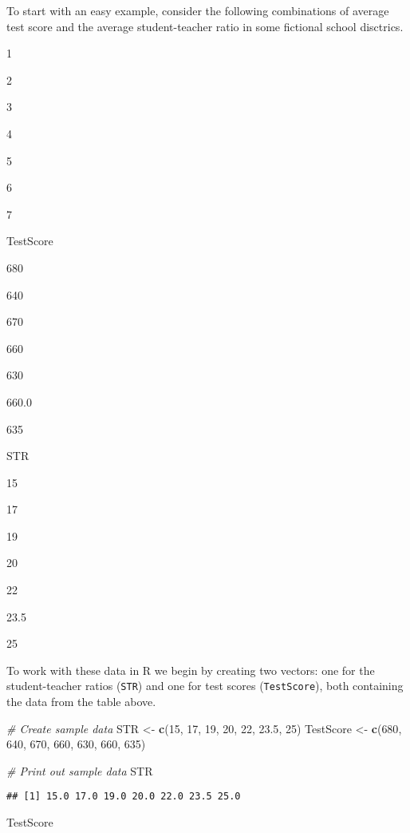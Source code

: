 \documentclass[]{book}
\newenvironment{Shaded}{\begin{snugshade}}{\end{snugshade}}
\newcommand{\KeywordTok}[1]{\textcolor[rgb]{0.13,0.29,0.53}{\textbf{#1}}}
\newcommand{\DecValTok}[1]{\textcolor[rgb]{0.00,0.00,0.81}{#1}}
\newcommand{\FloatTok}[1]{\textcolor[rgb]{0.00,0.00,0.81}{#1}}
\newcommand{\StringTok}[1]{\textcolor[rgb]{0.31,0.60,0.02}{#1}}
\newcommand{\CommentTok}[1]{\textcolor[rgb]{0.56,0.35,0.01}{\textit{#1}}}
\newcommand{\NormalTok}[1]{#1}
\theoremstyle{definition}
\theoremstyle{definition}
\theoremstyle{definition}
\theoremstyle{remark}
\begin{document}
To start with an easy example, consider the following combinations of
average test score and the average student-teacher ratio in some
fictional school disctrics.

1

2

3

4

5

6

7

TestScore

680

640

670

660

630

660.0

635

STR

15

17

19

20

22

23.5

25

To work with these data in R we begin by creating two vectors: one for
the student-teacher ratios (\texttt{STR}) and one for test scores
(\texttt{TestScore}), both containing the data from the table above.

\begin{Shaded}
\begin{Highlighting}[]
\CommentTok{# Create sample data}
\NormalTok{STR <-}\StringTok{ }\KeywordTok{c}\NormalTok{(}\DecValTok{15}\NormalTok{, }\DecValTok{17}\NormalTok{, }\DecValTok{19}\NormalTok{, }\DecValTok{20}\NormalTok{, }\DecValTok{22}\NormalTok{, }\FloatTok{23.5}\NormalTok{, }\DecValTok{25}\NormalTok{)}
\NormalTok{TestScore <-}\StringTok{ }\KeywordTok{c}\NormalTok{(}\DecValTok{680}\NormalTok{, }\DecValTok{640}\NormalTok{, }\DecValTok{670}\NormalTok{, }\DecValTok{660}\NormalTok{, }\DecValTok{630}\NormalTok{, }\DecValTok{660}\NormalTok{, }\DecValTok{635}\NormalTok{) }

\CommentTok{# Print out sample data}
\NormalTok{STR}
\end{Highlighting}
\end{Shaded}

\begin{verbatim}
## [1] 15.0 17.0 19.0 20.0 22.0 23.5 25.0
\end{verbatim}

\begin{Shaded}
\begin{Highlighting}[]
\NormalTok{TestScore}
\end{Highlighting}
\end{Shaded}
\end{document}
